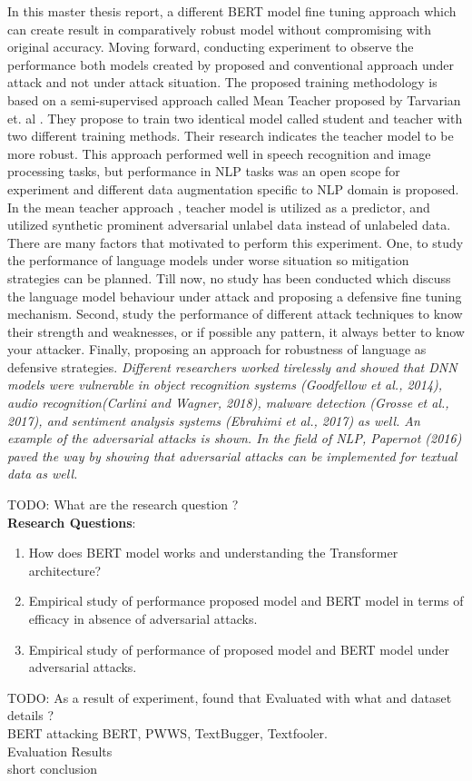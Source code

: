 \documentclass[%
	BCOR=8mm, %
	DIV=12, 
	toc=bibliography, %
	toc=listof, %
	oneside, %
	egregdoesnotlikesansseriftitles, %
	]{scrbook}
\begin{document}
In this master thesis report, a different BERT model fine tuning approach which can create result in comparatively robust model without compromising with original accuracy. Moving forward, conducting experiment to observe the performance both models created by proposed and conventional approach  under attack and not under attack situation. The proposed training methodology is based on a semi-supervised approach called Mean Teacher proposed by Tarvarian et$.$ al \cite{tarvainen_mean_2018}. They propose to train two identical model called student and teacher  with two different training methods. Their research indicates the teacher model to be more robust. This approach performed well in speech recognition and image processing tasks, but performance in NLP tasks was an open scope for experiment and different data augmentation specific to NLP domain is proposed. In the mean teacher approach , teacher model is utilized as a predictor, and utilized synthetic prominent adversarial unlabel data instead of unlabeled data.\\
There are many factors that motivated to perform this experiment. One, to study the performance of language models under worse situation so mitigation strategies can be planned. Till now, no  study has been conducted which discuss the language model behaviour under attack and proposing a defensive fine tuning mechanism.  Second, study the performance of different attack techniques to know their strength and weaknesses, or if possible any pattern, it always better to know your attacker. Finally, proposing an approach for robustness of language as defensive strategies.
\textit{ Different researchers worked tirelessly and showed that DNN models were vulnerable in object recognition systems (Goodfellow et al., 2014), audio recognition(Carlini and Wagner, 2018), malware detection (Grosse et al., 2017), and sentiment analysis systems (Ebrahimi et al., 2017) as well. An example of the adversarial attacks is shown.\cite{huq_adversarial_2020}
In the field of NLP, Papernot (2016) paved the way by showing that adversarial attacks can be implemented for textual data as well.\cite{huq_adversarial_2020}}

TODO:
What are the research question ?\\
\textbf{Research Questions}:
\begin{enumerate}
    \item How does BERT model works and understanding the Transformer architecture?
    \item Empirical study of performance proposed model and BERT model in terms of efficacy in absence of adversarial attacks.
    \item Empirical study of performance of proposed model and BERT model under adversarial attacks.
\end{enumerate}
 TODO: 
 As a result of experiment, found that 
 Evaluated with what and dataset details ?\\
 BERT attacking BERT, PWWS, TextBugger, Textfooler.\\
 Evaluation Results\\
 short conclusion\\
 
\end{document}
